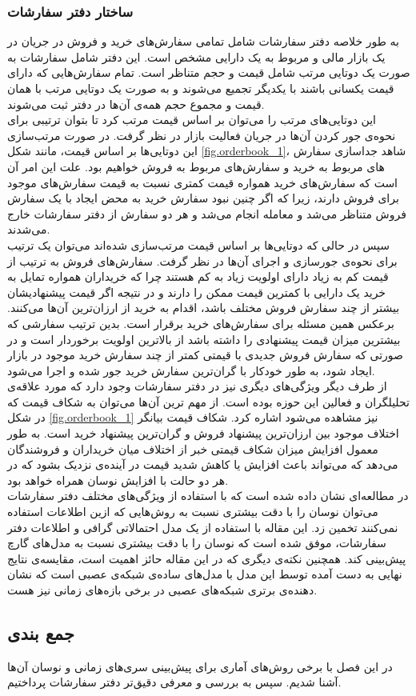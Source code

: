 \subsubsection{ساختار دفتر سفارشات}
به طور خلاصه دفتر سفارشات شامل تمامی سفارش‌های خرید و فروش در جریان در یک بازار مالی و مربوط به یک دارایی مشخص است. این دفتر شامل سفارشات به صورت یک دوتایی مرتب شامل قیمت و حجم متناظر است. تمام سفارش‌هایی که دارای قیمت یکسانی باشند با یکدیگر تجمیع می‌شوند و به صورت یک دوتایی مرتب با همان قیمت و مجموع حجم همه‌ی آن‌ها در دفتر ثبت می‌شوند.\\
این دوتایی‌های مرتب را می‌توان بر اساس قیمت مرتب کرد تا بتوان ترتیبی برای نحوه‌ی جور کردن آن‌ها در جریان فعالیت بازار در نظر گرفت. در صورت مرتب‌سازی این دوتایی‌ها بر اساس قیمت، مانند شکل \ref{fig.orderbook_1}، شاهد جداسازی سفارش های مربوط به خرید و سفارش‌های مربوط به فروش خواهیم بود. علت این امر آن است که سفارش‌های خرید همواره قیمت کمتری نسبت به قیمت سفارش‌های موجود برای فروش دارند، زیرا که اگر چنین نبود سفارش خرید به محض ایجاد با یک سفارش فروش متناظر می‌شد و معامله‌ انجام می‌شد و هر دو سفارش از دفتر سفارشات خارج می‌شدند.\\
سپس در حالی که دوتایی‌ها بر اساس قیمت مرتب‌سازی شده‌اند می‌توان یک ترتیب ‌برای نحوه‌ی جورسازی و اجرای آن‌ها در نظر گرفت. سفارش‌های فروش به ترتیب از قیمت کم به زیاد دارای اولویت زیاد به کم هستند چرا که خریداران همواره تمایل به خرید یک دارایی با کمترین قیمت ممکن را دارند و در نتیجه اگر قیمت پیشنهادیشان بیشتر از چند سفارش فروش مختلف باشد،‌ اقدام به خرید از ارزان‌ترین آن‌ها می‌کنند. برعکس همین مسئله برای سفارش‌های خرید برقرار است. بدین ترتیب سفارشی که بیشترین میزان قیمت پیشنهادی را داشته باشد از بالاترین اولویت برخوردار است و در صورتی که سفارش فروش جدیدی با قیمتی کمتر از چند سفارش خرید موجود در بازار ایجاد شود،‌ به طور خودکار با گران‌ترین سفارش خرید جور شده و اجرا می‌شود.\\
از طرف دیگر ویژگی‌های دیگری نیز در دفتر سفارشات وجود دارد که مورد علاقه‌ی تحلیلگران و فعالین این حوزه بوده است. از مهم ترین آن‌ها می‌توان به شکاف قیمت که در شکل \ref{fig.orderbook_1} نیز مشاهده می‌شود اشاره کرد. شکاف قیمت بیانگر اختلاف موجود بین ارزان‌ترین پیشنهاد فروش و گران‌ترین پیشنهاد خرید است. به طور معمول افزایش میزان شکاف قیمتی خبر از اختلاف میان خریداران و فروشندگان می‌دهد که می‌تواند باعث افزایش یا کاهش شدید قیمت در آینده‌ی نزدیک بشود که در هر دو حالت با افزایش نوسان همراه خواهد بود.\\
در مطالعه‌ای نشان داده شده است که با استفاده از ویژگی‌های مختلف دفتر سفارشات می‌توان نوسان را با دقت بیشتری نسبت به روش‌هایی که ازین اطلاعات استفاده نمی‌کنند تخمین زد\cite{guo2018bitcoin}. این مقاله با استفاده از یک مدل احتمالاتی گرافی و اطلاعات دفتر سفارشات، موفق شده است که نوسان را با دقت بیشتری نسبت به مدل‌های گارچ پیش‌بینی کند. همچنین نکته‌ی دیگری که در این مقاله‌ حائز اهمیت است، مقایسه‌ی نتایج نهایی به دست آمده توسط این مدل با مدل‌های ساده‌ی شبکه‌ی عصبی است که نشان دهنده‌ی برتری شبکه‌های عصبی در برخی بازه‌های زمانی نیز هست.
\subsection{جمع بندی}
در این فصل با برخی روش‌های آماری برای پیش‌بینی سری‌های زمانی و نوسان آن‌ها آشنا شدیم. سپس به بررسی و معرفی دقیق‌تر دفتر سفارشات پرداختیم.


